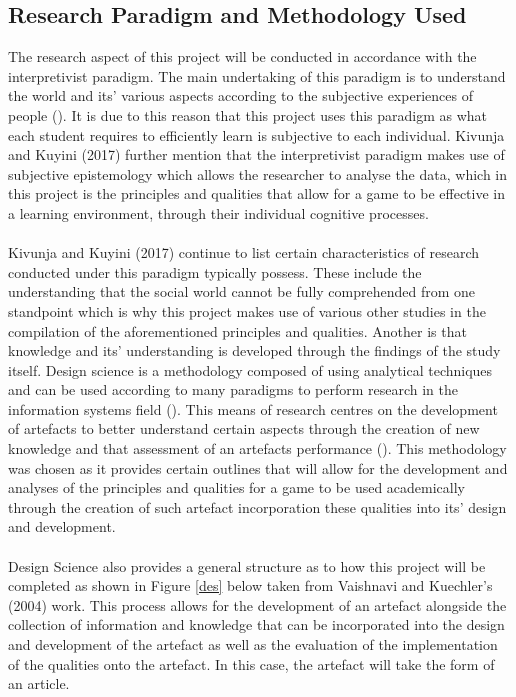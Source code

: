 \subsection{Research Paradigm and Methodology Used}
The research aspect of this project will be conducted in accordance with the interpretivist paradigm. The main undertaking of this paradigm is to understand the world and its’ various aspects according to the subjective experiences of people (\cite{kivunja2017understanding}). It is due to this reason that this project uses this paradigm as what each student requires to efficiently learn is subjective to each individual. Kivunja and Kuyini  (2017) further mention that the interpretivist paradigm makes use of subjective epistemology which allows the researcher to analyse the data, which in this project is the principles and qualities that allow for a game to be effective in a learning environment, through their individual cognitive processes. 
\\\\
Kivunja and Kuyini (2017) continue to list certain characteristics of research conducted under this paradigm typically possess. These include the understanding that the social world cannot be fully comprehended from one standpoint which is why this project makes use of various other studies in the compilation of the aforementioned principles and qualities. Another is that knowledge and its’ understanding is developed through the findings of the study itself.
\newpage
\noindent Design science is a methodology composed of using analytical techniques and can be used according to many paradigms to perform research in the information systems field (\cite{vaishnavi2004design}). This means of research centres on the development of artefacts to better understand certain aspects through the creation of new knowledge and that assessment of an artefacts performance (\cite{vaishnavi2004design}). This methodology was chosen as it provides certain outlines that will allow for the development and analyses of the principles and qualities for a game to be used academically through the creation of such artefact incorporation these qualities into its’ design and development. 
\\\\
Design Science also provides a general structure as to how this project will be completed as shown in Figure \ref{des} below taken from Vaishnavi and Kuechler’s (2004) work. This process allows for the development of an artefact alongside the collection of information and knowledge that can be incorporated into the design and development of the artefact as well as the evaluation of the implementation of the qualities onto the artefact. In  this case, the artefact will take the form of an article.

